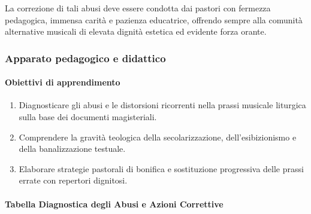 \documentclass[12pt,a4paper]{article}
\begin{document}
	La correzione di tali abusi deve essere condotta dai pastori con fermezza pedagogica, immensa carità e pazienza educatrice, offrendo sempre alla comunità alternative musicali di elevata dignità estetica ed evidente forza orante.
	
	\subsubsection{Apparato pedagogico e didattico}\label{apparato-pedagogico-e-didattico-14}
	
	\paragraph{Obiettivi di apprendimento}\label{obiettivi-di-apprendimento-14}
	
	\begin{enumerate}[label=\arabic*.,leftmargin=*]
		\item Diagnosticare gli abusi e le distorsioni ricorrenti nella prassi musicale liturgica sulla base dei documenti magisteriali.
		\item Comprendere la gravità teologica della secolarizzazione, dell'esibizionismo e della banalizzazione testuale.
		\item Elaborare strategie pastorali di bonifica e sostituzione progressiva delle prassi errate con repertori dignitosi.
	\end{enumerate}
	
	\paragraph{Tabella Diagnostica degli Abusi e Azioni Correttive}\label{tabella-diagnostica-degli-abusi-e-azioni-correttive}
	
\end{document}

